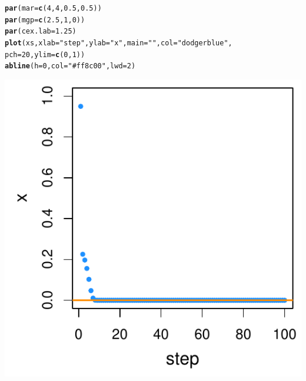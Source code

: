 \documentclass[Tutorial]{../cbg}\usepackage[]{graphicx}\usepackage[]{color}
\makeatletter
\def\maxwidth{ %
  \ifdim\Gin@nat@width>\linewidth
    \linewidth
  \else
    \Gin@nat@width
  \fi
}
\newcommand{\hlnum}[1]{\textcolor[rgb]{0.686,0.059,0.569}{#1}}%
\newcommand{\hlstr}[1]{\textcolor[rgb]{0.192,0.494,0.8}{#1}}%
\newcommand{\hlstd}[1]{\textcolor[rgb]{0.345,0.345,0.345}{#1}}%
\newcommand{\hlkwc}[1]{\textcolor[rgb]{0.333,0.667,0.333}{#1}}%
\newcommand{\hlkwd}[1]{\textcolor[rgb]{0.737,0.353,0.396}{\textbf{#1}}}%
\newenvironment{kframe}{%
 \def\at@end@of@kframe{}%
 \ifinner\ifhmode%
  \def\at@end@of@kframe{\end{minipage}}%
  \begin{minipage}{\columnwidth}%
 \fi\fi%
 \def\FrameCommand##1{\hskip\@totalleftmargin \hskip-\fboxsep
 \colorbox{shadecolor}{##1}\hskip-\fboxsep
     \hskip-\linewidth \hskip-\@totalleftmargin \hskip\columnwidth}%
 \MakeFramed {\advance\hsize-\width
   \@totalleftmargin\z@ \linewidth\hsize
   \@setminipage}}%
 {\par\unskip\endMakeFramed%
 \at@end@of@kframe}
\newenvironment{knitrout}{}{} %
\makeatother
\begin{document}
\begin{knitrout}
\color{fgcolor}\begin{kframe}
\begin{alltt}
\hlkwd{par}\hlstd{(}\hlkwc{mar} \hlstd{=} \hlkwd{c}\hlstd{(}\hlnum{4}\hlstd{,} \hlnum{4}\hlstd{,} \hlnum{0.5}\hlstd{,} \hlnum{0.5}\hlstd{))}
\hlkwd{par}\hlstd{(}\hlkwc{mgp} \hlstd{=} \hlkwd{c}\hlstd{(}\hlnum{2.5}\hlstd{,} \hlnum{1}\hlstd{,} \hlnum{0}\hlstd{))}
\hlkwd{par}\hlstd{(}\hlkwc{cex.lab} \hlstd{=} \hlnum{1.25}\hlstd{)}
\hlkwd{plot}\hlstd{(xs,} \hlkwc{xlab} \hlstd{=} \hlstr{"step"}\hlstd{,} \hlkwc{ylab} \hlstd{=} \hlstr{"x"}\hlstd{,} \hlkwc{main} \hlstd{=} \hlstr{""}\hlstd{,} \hlkwc{col} \hlstd{=} \hlstr{"dodgerblue"}\hlstd{,}
    \hlkwc{pch} \hlstd{=} \hlnum{20}\hlstd{,} \hlkwc{ylim} \hlstd{=} \hlkwd{c}\hlstd{(}\hlnum{0}\hlstd{,} \hlnum{1}\hlstd{))}
\hlkwd{abline}\hlstd{(}\hlkwc{h} \hlstd{=} \hlnum{0}\hlstd{,} \hlkwc{col} \hlstd{=} \hlstr{"#ff8c00"}\hlstd{,} \hlkwc{lwd} \hlstd{=} \hlnum{2}\hlstd{)}
\end{alltt}
\end{kframe}

{\centering \includegraphics[width=\maxwidth]{figure/minimal-unnamed-chunk-2-1} 

}



\end{knitrout}
\end{document}

